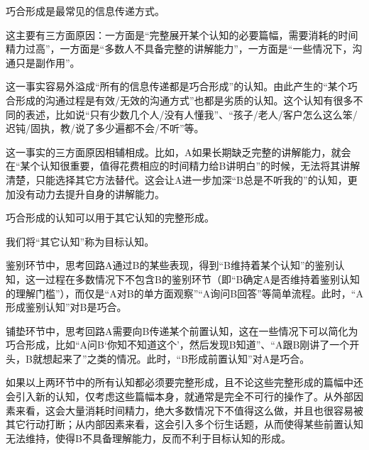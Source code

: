 巧合形成是最常见的信息传递方式。
\begin{explain}
这主要有三方面原因：一方面是“完整展开某个认知的必要篇幅，需要消耗的时间精力过高”，一方面是“多数人不具备完整的讲解能力”，一方面是“一些情况下，沟通只是副作用”。

这一事实容易外溢成“所有的信息传递都是巧合形成”的认知。由此产生的“某个巧合形成的沟通过程是有效/无效的沟通方式”也都是劣质的认知。这个认知有很多不同的表述，比如说“只有少数几个人/没有人懂我”、“孩子/老人/客户怎么这么笨/迟钝/固执，教/说了多少遍都不会/不听”等。

这一事实的三方面原因相辅相成。比如，A如果长期缺乏完整的讲解能力，就会在“某个认知很重要，值得花费相应的时间精力给B讲明白”的时候，无法将其讲解清楚，只能选择其它方法替代。这会让A进一步加深“B总是不听我的”的认知，更加没有动力去提升自身的讲解能力。
\end{explain}
巧合形成的认知可以用于其它认知的完整形成。
\begin{explain}
我们将“其它认知”称为目标认知。

鉴别环节中，思考回路A通过B的某些表现，得到“B维持着某个认知”的鉴别认知，这一过程在多数情况下不包含B的鉴别环节（即“B确定A是否维持着鉴别认知的理解门槛”），而仅是“A对B的单方面观察”“A询问B回答”等简单流程。此时，“A形成鉴别认知”对B是巧合。

铺垫环节中，思考回路A需要向B传递某个前置认知，这在一些情况下可以简化为巧合形成，比如“A问B‘你知不知道这个’，然后发现B知道”、“A跟B刚讲了一个开头，B就想起来了”之类的情况。此时，“B形成前置认知”对A是巧合。

如果以上两环节中的所有认知都必须要完整形成，且不论这些完整形成的篇幅中还会引入新的认知，仅考虑这些篇幅本身，就通常是完全不可行的操作了。从外部因素来看，这会大量消耗时间精力，绝大多数情况下不值得这么做，并且也很容易被其它行动打断；从内部因素来看，这会引入多个衍生话题，从而使得某些前置认知无法维持，使得B不具备理解能力，反而不利于目标认知的形成。
\end{explain}


